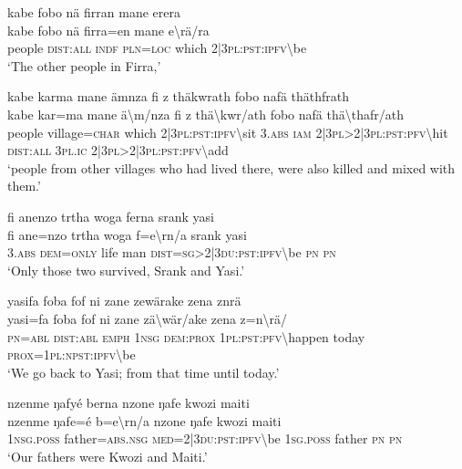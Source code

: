 \ea\label{ex:4:a1720}
kabe fobo nä firran mane erera\\
\gll kabe	fobo	nä	firra=en	mane	e{\textbackslash}rä/ra\\
     people	\textsc{dist}:\textsc{all}	\textsc{indf}	\textsc{pln}=\textsc{loc}	which	2|3\textsc{pl}:\textsc{pst}:\textsc{ipfv}{\textbackslash}be\\
\glt `The other people in Firra,'
\z

\ea\label{ex:4:a1721}
kabe karma mane ämnza fi z thäkwrath fobo nafä thäthfrath\\
\gll kabe	kar=ma	mane	ä{\textbackslash}m/nza	fi	z	thä{\textbackslash}kwr/ath	fobo	nafä	thä{\textbackslash}thafr/ath\\
     people	village=\textsc{char}	which	2|3\textsc{pl}:\textsc{pst}:\textsc{ipfv}{\textbackslash}sit	3.\textsc{abs}	\textsc{iam}	2|3\textsc{pl}>2|3\textsc{pl}:\textsc{pst}:\textsc{pfv}{\textbackslash}hit	\textsc{dist}:\textsc{all}	3\textsc{pl}.\textsc{ic}	2|3\textsc{pl}>2|3\textsc{pl}:\textsc{pst}:\textsc{pfv}{\textbackslash}add\\
\glt `people from other villages who had lived there, were also killed and mixed with them.'
\z

\ea\label{ex:4:a1722}
fi anenzo trtha woga ferna srank yasi\\
\gll fi	ane=nzo	trtha	woga	f=e{\textbackslash}rn/a	srank	yasi\\
     3.\textsc{abs}	\textsc{dem}=\textsc{only}	life	man	\textsc{dist}=\textsc{sg}>2|3\textsc{du}:\textsc{pst}:\textsc{ipfv}{\textbackslash}be	\textsc{pn}	\textsc{pn}\\
\glt `Only those two survived, Srank and Yasi.'
\z

\ea\label{ex:4:a1725}
yasifa foba fof ni zane zewärake zena znrä\\
\gll yasi=fa	foba	fof	ni	zane	zä{\textbackslash}wär/ake	zena	z=n{\textbackslash}rä/\\
     \textsc{pn}=\textsc{abl}	\textsc{dist}:\textsc{abl}	\textsc{emph}	1\textsc{nsg}	\textsc{dem}:\textsc{prox}	1\textsc{pl}:\textsc{pst}:\textsc{pfv}{\textbackslash}happen	today	\textsc{prox}=1\textsc{pl}:\textsc{npst}:\textsc{ipfv}{\textbackslash}be\\
\glt `We go back to Yasi; from that time until today.'
\z

\ea\label{ex:4:a1726}
nzenme ŋafyé berna nzone ŋafe kwozi maiti\\
\gll nzenme	ŋafe=é	b=e{\textbackslash}rn/a	nzone	ŋafe	kwozi	maiti\\
     1\textsc{nsg}.\textsc{poss}	father=\textsc{abs}.\textsc{nsg}	\textsc{med}=2|3\textsc{du}:\textsc{pst}:\textsc{ipfv}{\textbackslash}be	1\textsc{sg}.\textsc{poss}	father	\textsc{pn}	\textsc{pn}\\
\glt `Our fathers were Kwozi and Maiti.'
\z

